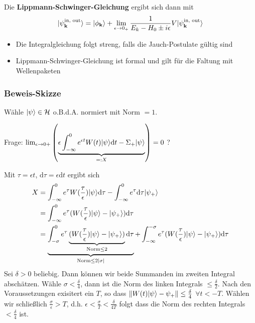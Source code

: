 \documentclass[11pt,a4paper]{report}
\newcommand{\norm}[1]{\left\lVert #1 \right\rVert}
\begin{document}
Die \textbf{Lippmann-Schwinger-Gleichung} ergibt sich dann mit
\begin{align*}
    |\psi_{\mathbf{k}}^{\text{in, out}}\rangle = |\phi_{\mathbf{k}}\rangle + \lim_{\epsilon \rightarrow 0_+} \frac{1}{E_k - H_0 \pm i \epsilon} V |\psi_\mathbf{k}^{\text{in, out}}\rangle
\end{align*}
\begin{itemize}
    \item Die Integralgleichung folgt streng, falls die Jauch-Postulate gültig sind
    \item Lippmann-Schwinger-Gleichung ist formal und gilt für die Faltung mit Wellenpaketen
\end{itemize}

\subsubsection{Beweis-Skizze}

Wähle $|\psi\rangle \in \mathcal{H}$ o.B.d.A. normiert mit Norm $=1$.

Frage: $\lim_{\epsilon\rightarrow 0+}\left(\underbrace{\epsilon \int_{-\infty}^0 e^{\epsilon t} W(t) |\psi\rangle \mathrm{d}t - \Sigma_+ |\psi\rangle}_{=: X} \right) = 0$ ?

Mit $\tau = \epsilon t$, $\mathrm{d}\tau = \epsilon \mathrm{d} t$ ergibt sich
\begin{align*}
    X &= \int_{-\infty}^0 e^\tau W(\frac{\tau}{\epsilon}) |\psi\rangle \mathrm{d} \tau - \int_{-\infty}^0 e^\tau \mathrm{d} \tau |\psi_+\rangle \\
    &= \int_{-\infty}^0 e^{\tau} (W(\frac{\tau}{\epsilon})|\psi\rangle - |\psi_+\rangle) \mathrm{d} \tau \\
    &= \underbrace{\int_{-\sigma}^0 e^{\tau} \underbrace{(W(\frac{\tau}{\epsilon})|\psi\rangle - |\psi_+\rangle)}_{\text{Norm} \leq 2} \mathrm{d} \tau}_{\text{Norm} \leq 2 |\sigma|} + \int_{-\infty}^{-\sigma} e^{\tau} (W(\frac{\tau}{\epsilon})|\psi\rangle - |\psi_+\rangle) \mathrm{d} \tau 
\end{align*}
Sei $\delta > 0$ beliebig. 
Dann können wir beide Summanden im zweiten Integral abschätzen.
Wähle $\sigma < \frac{\delta}{4}$, dann ist die Norm des linken Integrals $\leq \frac{\delta}{2}$.
Nach den Voraussetzungen exisitert ein $T$, so dass $\norm{W(t) \ket{\psi} - \psi_+} \leq \frac{\delta}{4}$ $\forall t < -T$.
Wählen wir schließlich $\frac{\sigma}{\epsilon}>T$, d.h. $\epsilon < \frac{\sigma}{T} < \frac{\delta}{4 T}$ folgt dass die Norm des rechten Integrals $< \frac{\delta}{4}$ ist.
\end{document}
